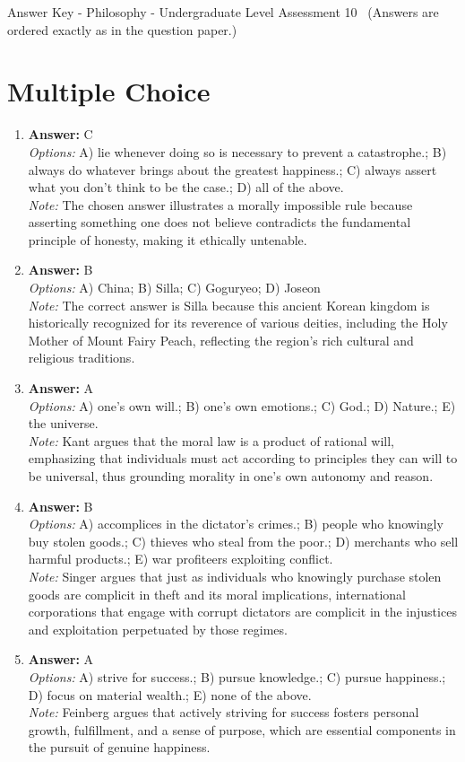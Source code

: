 \documentclass[12pt]{article}
\begin{document}
\begin{center}
Answer Key - Philosophy - Undergraduate Level Assessment 10 \
\small (Answers are ordered exactly as in the question paper.)
\end{center}

\section*{Multiple Choice}
\begin{enumerate}[label=\arabic*.]
\item \textbf{Answer:} C
\\ \textit{Options:} A) lie whenever doing so is necessary to prevent a catastrophe.; B) always do whatever brings about the greatest happiness.; C) always assert what you don't think to be the case.; D) all of the above.
\\ \textit{Note:} The chosen answer illustrates a morally impossible rule because asserting something one does not believe contradicts the fundamental principle of honesty, making it ethically untenable.
\item \textbf{Answer:} B
\\ \textit{Options:} A) China; B) Silla; C) Goguryeo; D) Joseon
\\ \textit{Note:} The correct answer is Silla because this ancient Korean kingdom is historically recognized for its reverence of various deities, including the Holy Mother of Mount Fairy Peach, reflecting the region's rich cultural and religious traditions.
\item \textbf{Answer:} A
\\ \textit{Options:} A) one's own will.; B) one's own emotions.; C) God.; D) Nature.; E) the universe.
\\ \textit{Note:} Kant argues that the moral law is a product of rational will, emphasizing that individuals must act according to principles they can will to be universal, thus grounding morality in one's own autonomy and reason.
\item \textbf{Answer:} B
\\ \textit{Options:} A) accomplices in the dictator's crimes.; B) people who knowingly buy stolen goods.; C) thieves who steal from the poor.; D) merchants who sell harmful products.; E) war profiteers exploiting conflict.
\\ \textit{Note:} Singer argues that just as individuals who knowingly purchase stolen goods are complicit in theft and its moral implications, international corporations that engage with corrupt dictators are complicit in the injustices and exploitation perpetuated by those regimes.
\item \textbf{Answer:} A
\\ \textit{Options:} A) strive for success.; B) pursue knowledge.; C) pursue happiness.; D) focus on material wealth.; E) none of the above.
\\ \textit{Note:} Feinberg argues that actively striving for success fosters personal growth, fulfillment, and a sense of purpose, which are essential components in the pursuit of genuine happiness.
\end{enumerate}
\end{document}
